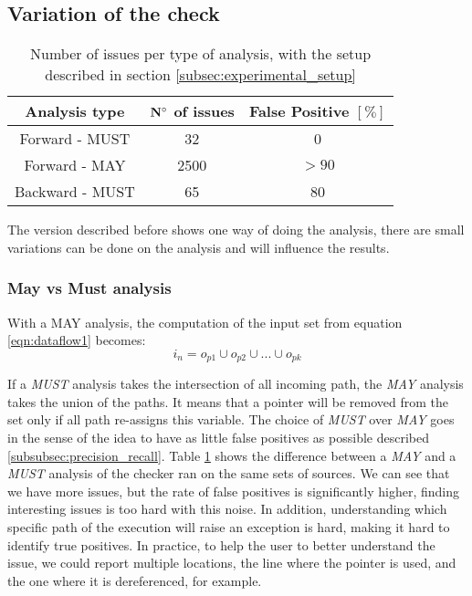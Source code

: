 \subsection{Variation of the check}
\label{subsec:rule_variation}

\begin{table}[h]
	\centering
	\caption{Number of issues per type of analysis, with the setup described in section \ref{subsec:experimental_setup}}
	\label{table:issue_per_analysis_type}
	\begin{tabular}{|c|c|c|}
		\hline
		\bf Analysis type &  \bf $\bf N^{\circ}$  of issues &  \bf False Positive $[\%]$ \\ \hline
		Forward - MUST &  32 &  0 \\ 
		Forward - MAY &  2500 & $> 90$  \\ 
		Backward - MUST &  65 & 80 \\ \hline
	\end{tabular}
\end{table}

The version described before shows one way of doing the analysis, there are small variations can be done on the analysis and will influence the results.

\subsubsection{May vs Must analysis}
\label{subsubsec:may_vs_must}

With a MAY analysis, the computation of the input set from equation \eqref{eqn:dataflow1} becomes:
\begin{equation}\label{eqn:mayvsmust}
i_{n} = o_{p1}  \cup   o_{p2}  \cup  ... \cup   o_{pk}
\end{equation}

If a \emph{MUST} analysis takes the intersection of all incoming path, the \emph{MAY} analysis takes the union of the paths. 
It means that a pointer will be removed from the set only if all path re-assigns this variable.
The choice of \emph{MUST} over \emph{MAY} goes in the sense of the idea to have as little false positives as possible described \ref{subsubsec:precision_recall}.
Table \ref{table:issue_per_analysis_type} shows the difference between a \emph{MAY} and a \emph{MUST} analysis of the checker ran on the same sets of sources.
We can see that we have more issues, but the rate of false positives is significantly higher, finding interesting issues is too hard with this noise. 
In addition, understanding which specific path of the execution will raise an exception is hard, making it hard to identify true positives.
In practice, to help the user to better understand the issue, we could report multiple locations, the line where the pointer is used, and the one where it is dereferenced, for example.


